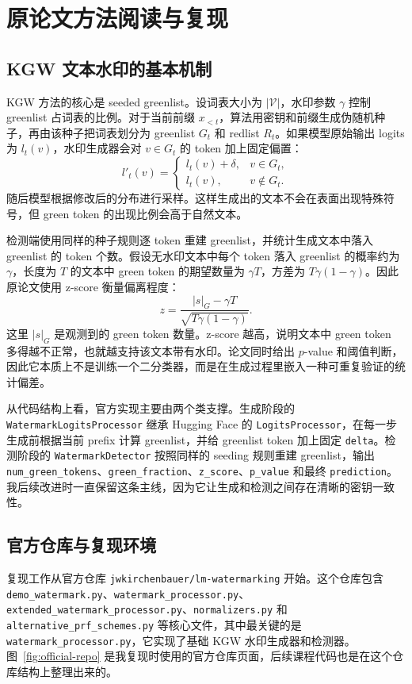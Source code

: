 \documentclass[12pt,a4paper,UTF8]{ctexart}
\newcommand{\codepath}[1]{\nolinkurl{#1}}
\begin{document}
\section{原论文方法阅读与复现}

\subsection{KGW 文本水印的基本机制}

KGW 方法的核心是 seeded greenlist。设词表大小为 $|\mathcal{V}|$，水印参数 $\gamma$ 控制 greenlist 占词表的比例。对于当前前缀 $x_{<t}$，算法用密钥和前缀生成伪随机种子，再由该种子把词表划分为 greenlist $G_t$ 和 redlist $R_t$。如果模型原始输出 logits 为 $l_t(v)$，水印生成器会对 $v\in G_t$ 的 token 加上固定偏置：
\[
l'_t(v)=
\begin{cases}
l_t(v)+\delta, & v\in G_t,\\
l_t(v), & v\notin G_t.
\end{cases}
\]
随后模型根据修改后的分布进行采样。这样生成出的文本不会在表面出现特殊符号，但 green token 的出现比例会高于自然文本。

检测端使用同样的种子规则逐 token 重建 greenlist，并统计生成文本中落入 greenlist 的 token 个数。假设无水印文本中每个 token 落入 greenlist 的概率约为 $\gamma$，长度为 $T$ 的文本中 green token 的期望数量为 $\gamma T$，方差为 $T\gamma(1-\gamma)$。因此原论文使用 z-score 衡量偏离程度：
\[
z=\frac{|s|_G-\gamma T}{\sqrt{T\gamma(1-\gamma)}}.
\]
这里 $|s|_G$ 是观测到的 green token 数量。z-score 越高，说明文本中 green token 多得越不正常，也就越支持该文本带有水印。论文同时给出 $p$-value 和阈值判断，因此它本质上不是训练一个二分类器，而是在生成过程里嵌入一种可重复验证的统计偏差。

从代码结构上看，官方实现主要由两个类支撑。生成阶段的 \texttt{WatermarkLogitsProcessor} 继承 Hugging Face 的 \texttt{LogitsProcessor}，在每一步生成前根据当前 prefix 计算 greenlist，并给 greenlist token 加上固定 \texttt{delta}。检测阶段的 \texttt{WatermarkDetector} 按照同样的 seeding 规则重建 greenlist，输出 \texttt{num\_green\_tokens}、\texttt{green\_fraction}、\texttt{z\_score}、\texttt{p\_value} 和最终 \texttt{prediction}。我后续改进时一直保留这条主线，因为它让生成和检测之间存在清晰的密钥一致性。

\subsection{官方仓库与复现环境}

复现工作从官方仓库 \codepath{jwkirchenbauer/lm-watermarking} 开始。这个仓库包含 \codepath{demo_watermark.py}、\codepath{watermark_processor.py}、\codepath{extended_watermark_processor.py}、\codepath{normalizers.py} 和 \codepath{alternative_prf_schemes.py} 等核心文件，其中最关键的是 \codepath{watermark_processor.py}，它实现了基础 KGW 水印生成器和检测器。图~\ref{fig:official-repo} 是我复现时使用的官方仓库页面，后续课程代码也是在这个仓库结构上整理出来的。
\end{document}
